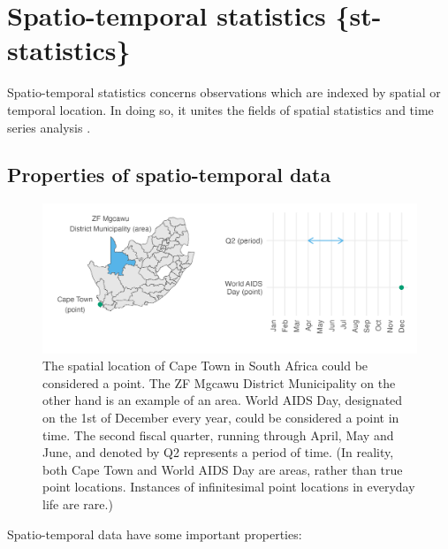 \documentclass[a4paper, nobind]{templates/ociamthesis}
\begin{document}
\hypertarget{spatio-temporal-statistics-st-statistics}{%
\section{Spatio-temporal statistics \{st-statistics\}}\label{spatio-temporal-statistics-st-statistics}}

Spatio-temporal statistics \autocite{cressie2015statistics} concerns observations which are indexed by spatial or temporal location.
In doing so, it unites the fields of spatial statistics \autocite{bivand2008applied} and time series analysis \autocite{shumway2017time}.

\hypertarget{properties-of-spatio-temporal-data}{%
\subsection{Properties of spatio-temporal data}\label{properties-of-spatio-temporal-data}}



\begin{figure}
\includegraphics[width=0.95\linewidth]{figures/bayesian/st} \caption{The spatial location of Cape Town in South Africa could be considered a point. The ZF Mgcawu District Municipality on the other hand is an example of an area. World AIDS Day, designated on the 1st of December every year, could be considered a point in time. The second fiscal quarter, running through April, May and June, and denoted by Q2 represents a period of time. (In reality, both Cape Town and World AIDS Day are areas, rather than true point locations. Instances of infinitesimal point locations in everyday life are rare.)}\label{fig:st}
\end{figure}

Spatio-temporal data have some important properties:
\end{document}
